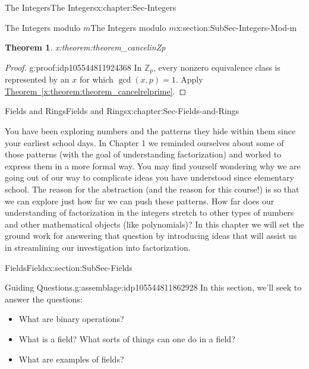\documentclass[oneside,10pt,]{book}
\newcommand{\xreffont}{\relax}
\numberwithin{equation}{section}
\def\Z{{\mathbb Z}}
\newtheorem{theorem}{Theorem}[section]
\begin{document}
\begin{chapterptx}{The Integers}{}{The Integers}{}{}{x:chapter:Sec-Integers}
\begin{sectionptx}{The Integers modulo \(m\)}{}{The Integers modulo \(m\)}{}{}{x:section:SubSec-Integers-Mod-m}
\begin{theorem}{}{}{x:theorem:theorem_cancelinZp}
\begin{enumerate}
\end{enumerate}
%
\end{theorem}
\begin{proof}{}{g:proof:idp105544811924368}
In \(\Z_p\), every nonzero equivalence class is represented by an \(x\) for which \(\gcd(x,p) = 1\). Apply \hyperref[x:theorem:theorem_cancelrelprime]{Theorem~{\xreffont\ref{x:theorem:theorem_cancelrelprime}}}.%
\end{proof}
\end{sectionptx}
\end{chapterptx}
%
%
\typeout{************************************************}
\typeout{************************************************}
%
\begin{chapterptx}{Fields and Rings}{}{Fields and Rings}{}{}{x:chapter:Sec-Fields-and-Rings}
\begin{introduction}{}%
You have been exploring numbers and the patterns they hide within them since your earliest school days. In Chapter 1 we reminded ourselves about some of those patterns (with the goal of understanding factorization) and worked to express them in a more formal way. You may find yourself wondering why we are going out of our way to complicate ideas you have understood since elementary school. The reason for the abstraction (and the reason for this course!) is so that we can explore just how far we can push these patterns. How far does our understanding of factorization in the integers stretch to other types of numbers and other mathematical objects (like polynomials)? In this chapter we will set the ground work for answering that question by introducing ideas that will assist us in streamlining our investigation into factorization.%
\end{introduction}%
%
%
\typeout{************************************************}
\typeout{************************************************}
%
\begin{sectionptx}{Fields}{}{Fields}{}{}{x:section:SubSec-Fields}
\begin{assemblage}{Guiding Questions.}{g:assemblage:idp105544811862928}%
In this section, we'll seek to answer the questions: %
\begin{itemize}[label=\textbullet]
\item{}What are binary operations?%
\item{}What is a field? What sorts of things can one do in a field?%
\item{}What are examples of fields?%
\end{itemize}

\end{assemblage}
\end{sectionptx}
\end{chapterptx}
\end{document}
